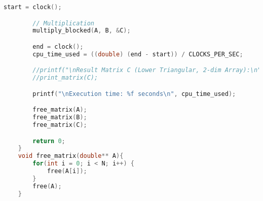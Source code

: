 \documentclass[14pt, russian]{matmex-diploma-custom}
\begin{document}
{\begin{lstlisting}[language=C, caption={Приложение 2D массивов без блочной оптимизации}]
        start = clock();

        // Multiplication
        multiply_blocked(A, B, &C);

        end = clock();
        cpu_time_used = ((double) (end - start)) / CLOCKS_PER_SEC;

        //printf("\nResult Matrix C (Lower Triangular, 2-dim Array):\n");
        //print_matrix(C);

        printf("\nExecution time: %f seconds\n", cpu_time_used);

        free_matrix(A);
        free_matrix(B);
        free_matrix(C);

        return 0;
    }
    void free_matrix(double** A){
        for(int i = 0; i < N; i++) {
            free(A[i]);
        }
        free(A);
    }

\end{lstlisting}
}
\end{document}
